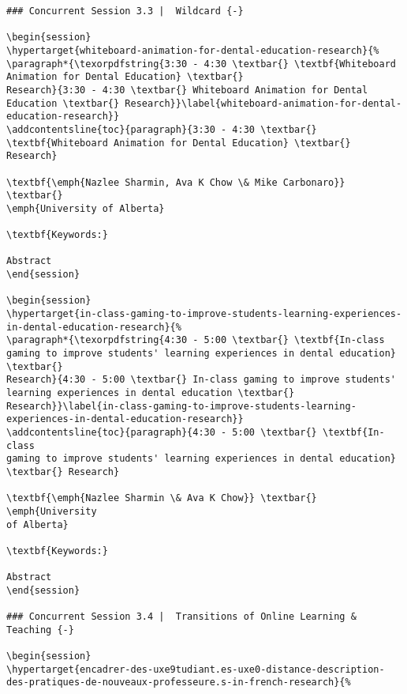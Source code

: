 \documentclass[
]{book}
\begin{document}
\begin{verbatim}
### Concurrent Session 3.3 |  Wildcard {-}

\begin{session}
\hypertarget{whiteboard-animation-for-dental-education-research}{%
\paragraph*{\texorpdfstring{3:30 - 4:30 \textbar{} \textbf{Whiteboard
Animation for Dental Education} \textbar{}
Research}{3:30 - 4:30 \textbar{} Whiteboard Animation for Dental Education \textbar{} Research}}\label{whiteboard-animation-for-dental-education-research}}
\addcontentsline{toc}{paragraph}{3:30 - 4:30 \textbar{}
\textbf{Whiteboard Animation for Dental Education} \textbar{} Research}

\textbf{\emph{Nazlee Sharmin, Ava K Chow \& Mike Carbonaro}} \textbar{}
\emph{University of Alberta}

\textbf{Keywords:}

Abstract
\end{session}

\begin{session}
\hypertarget{in-class-gaming-to-improve-students-learning-experiences-in-dental-education-research}{%
\paragraph*{\texorpdfstring{4:30 - 5:00 \textbar{} \textbf{In-class
gaming to improve students' learning experiences in dental education}
\textbar{}
Research}{4:30 - 5:00 \textbar{} In-class gaming to improve students' learning experiences in dental education \textbar{} Research}}\label{in-class-gaming-to-improve-students-learning-experiences-in-dental-education-research}}
\addcontentsline{toc}{paragraph}{4:30 - 5:00 \textbar{} \textbf{In-class
gaming to improve students' learning experiences in dental education}
\textbar{} Research}

\textbf{\emph{Nazlee Sharmin \& Ava K Chow}} \textbar{} \emph{University
of Alberta}

\textbf{Keywords:}

Abstract
\end{session}

### Concurrent Session 3.4 |  Transitions of Online Learning & Teaching {-}

\begin{session}
\hypertarget{encadrer-des-uxe9tudiant.es-uxe0-distance-description-des-pratiques-de-nouveaux-professeure.s-in-french-research}{%

\end{verbatim}
\end{document}
